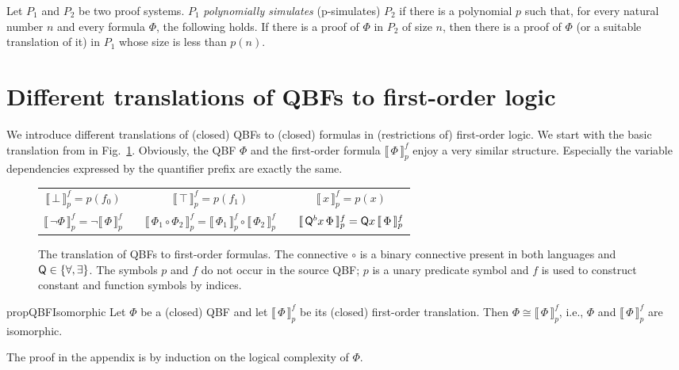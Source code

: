 \documentclass{llncs}
\newcommand{\quantifier}{{\sf Q}}
\newcommand{\falsum}{\bot}
\newcommand{\verum}{\top}
\newcommand{\QBFtoPL}[3]{\llbracket\,#1\,\rrbracket_{#2}^{#3}}
\begin{document}
Let $P_1$ and $P_2$ be two proof systems.  $P_1$
\emph{polynomially simulates} (p-simulates) $P_2$ if there is a
polynomial $p$ such that, for every natural number $n$ and every
formula $\Phi$, the following holds. If there is a proof of
$\Phi$ in $P_2$ of size $n$, then there is a proof of $\Phi$ (or
a suitable translation of it) in $P_1$ whose size is less than $p(n)$.

\section{Different translations of QBFs to first-order logic}
\label{sec:diff-trans}


We introduce different translations of (closed) QBFs to (closed)
formulas in (restrictions of) first-order logic.  We start with the
basic translation from \cite{DBLP:conf/cade/SeidlLB12} in
Fig.~\ref{fig:translation1}.  Obviously, the QBF $\Phi$ and the
first-order formula $\QBFtoPL{\Phi}{p}{f}$ enjoy a very similar
structure. Especially the variable dependencies expressed by the
quantifier prefix are exactly the same.

\begin{figure}[t]
\begin{tabular}{ccccc}
$\QBFtoPL{\falsum}{p}{f} = p(f_{0})$ & \hspace{1em} &
$\QBFtoPL{\verum}{p}{f} = p(f_{1})$  & \hspace{1em} &
$\QBFtoPL{x}{p}{f} = p(x)$       
\\[1.5em]
\multicolumn{1}{c}{
$\QBFtoPL{\neg \Phi}{p}{f} = 
\neg \QBFtoPL{\Phi}{p}{f}$
} & &
\multicolumn{1}{c}{
$\QBFtoPL{\Phi_1 \circ \Phi_2}{p}{f} = 
\QBFtoPL{\Phi_1}{p}{f} \circ \QBFtoPL{\Phi_2}{p}{f}$} 
& & 
\multicolumn{1}{c}{
$\QBFtoPL{\quantifier^b x\, \Phi}{p}{f} = 
\quantifier x\, \QBFtoPL{\Phi}{p}{f}$
}\\
\end{tabular}
\caption{\label{fig:translation1} The translation of QBFs to
  first-order formulas. The connective $\circ$ is a binary connective
  present in both languages and $\quantifier \in \{\forall,
  \exists\}$.  The symbols $p$ and $f$ do not occur in the source QBF;
  $p$ is a unary predicate symbol and $f$ is used to construct
  constant and function symbols by indices.  }
\end{figure}


\begin{restatable}{prop}{QBFIsomorphic}
\label{prop:isomorphic}Let $\Phi$ be a (closed) QBF and let $\QBFtoPL{\Phi}{p}{f}$ be its
(closed) first-order translation. Then $\Phi \cong
\QBFtoPL{\Phi}{p}{f}$, i.e., $\Phi$ and $\QBFtoPL{\Phi}{p}{f}$ are
isomorphic. 
\end{restatable}
\noindent
The proof in the appendix is by induction on the logical complexity of
$\Phi$.
\end{document}
